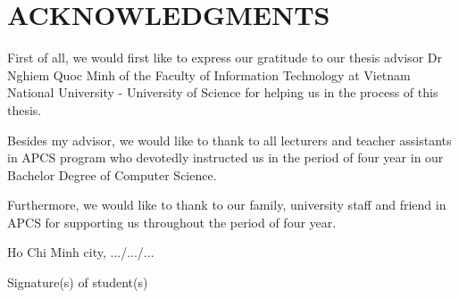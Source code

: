 \chapter*{ACKNOWLEDGMENTS}
\label{thanks}

First of all, we would first like to express our gratitude to our thesis advisor Dr Nghiem Quoc Minh of the Faculty of Information Technology at Vietnam National University - University of Science for helping us in the process of this thesis.

Besides my advisor, we would like to thank to all lecturers and teacher assistants in APCS program who devotedly instructed us in the period of four year in our Bachelor Degree of Computer Science. 

Furthermore, we would like to thank to our family, university staff and friend in APCS for supporting us throughout the period of four year.





\vspace{3cm}
\hspace{7cm}
\begin{minipage}[ht]{0.48\textwidth}
\begin{center}
Ho Chi Minh city, .../.../...

Signature(s) of student(s) 
\\
\vspace{3cm}
\tenSV  ~~~~~~~   \tenSVt 
\end{center}
\end{minipage}
